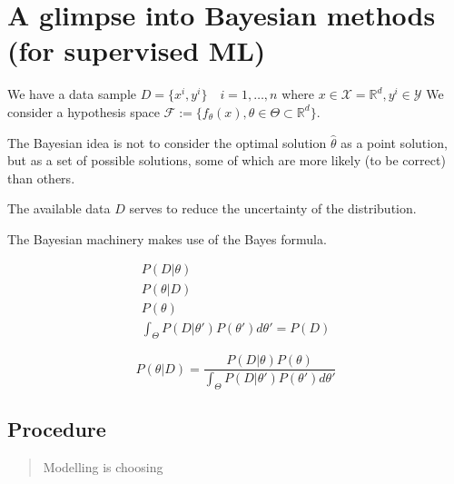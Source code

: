 \section[A glimpse into Bayesian methods]{A glimpse into Bayesian methods (for supervised ML)}

We have a data sample \(D = \{ x^i, y^i\}\quad i = 1, \dots, n\)
where \(x \in \mathcal{X} = \mathds{R}^d, y^i \in \mathcal{Y}\)
We consider a hypothesis space
\(\mathcal{F} := \{ f_\theta (x), \theta \in \Theta \subset \mathds{R}^d \}\).

The Bayesian idea is not to consider the optimal solution
\(\hat{\theta}\) as a point solution, but as a set of possible solutions,
some of which are more likely (to be correct) than others.

The available data \(D\) serves to reduce the uncertainty of the
distribution.

The Bayesian machinery makes use of the Bayes formula.

\begin{align*}
	P(D | \theta) \tag{likelihood} \\
	P(\theta | D) \tag{posterior}  \\
	P(\theta) \tag{prior}          \\
	\int_\Theta P(D | \theta') P(\theta') d\theta' = P(D) \tag{EXPECTED \equiv EVIDENCE}
\end{align*}

\[
	P(\theta | D) = \frac{P(D | \theta) P(\theta)}
	{ \int_\Theta P(D | \theta') P(\theta') d\theta' }
\]

\subsection{Procedure}

\begin{quote}
	Modelling is choosing
\end{quote}

